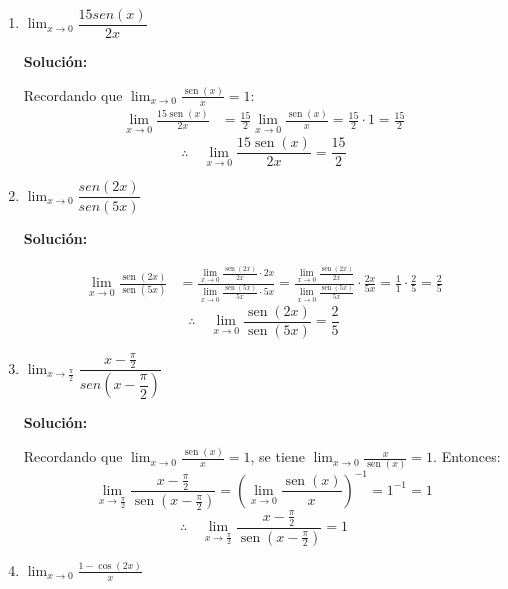\documentclass[12pt]{article}
\newcommand{\solucion}{%
    \vspace{0.8em}%
    \textbf{Solución:}%
}
\begin{document}
\begin{enumerate}[label=\alph*)]
    \item $\lim_{x \to 0} \dfrac{15sen(x)}{2x}$

    \solucion

    Recordando que $\displaystyle\lim_{x\to0}\frac{\operatorname{sen}(x)}{x} = 1$:
    \begin{align*}
        \lim_{x\to0}\frac{15\operatorname{sen}(x)}{2x}
        &= \frac{15}{2}\lim_{x\to0}\frac{\operatorname{sen}(x)}{x}
        = \frac{15}{2} \cdot 1 = \frac{15}{2}
    \end{align*}
    \[
        \therefore\quad \lim_{x\to0}\frac{15\operatorname{sen}(x)}{2x} = \frac{15}{2}
    \]

    \item $\lim_{x \to 0} \dfrac{sen(2x)}{sen(5x)}$

    \solucion
    \begin{align*}
        \lim_{x\to0}\frac{\operatorname{sen}(2x)}{\operatorname{sen}(5x)}
        &= \frac{\displaystyle\lim_{x\to0}\frac{\operatorname{sen}(2x)}{2x}\cdot 2x}{\displaystyle\lim_{x\to0}\frac{\operatorname{sen}(5x)}{5x}\cdot 5x}
        = \frac{\displaystyle\lim_{x\to0}\frac{\operatorname{sen}(2x)}{2x}}{\displaystyle\lim_{x\to0}\frac{\operatorname{sen}(5x)}{5x}} \cdot \frac{2x}{5x}
        = \frac{1}{1} \cdot \frac{2}{5} = \frac{2}{5}
    \end{align*}
    \[
        \therefore\quad \lim_{x\to0}\frac{\operatorname{sen}(2x)}{\operatorname{sen}(5x)} = \frac{2}{5}
    \]

    \item $\lim_{x\to\frac{\pi}{2}} \dfrac{x-\frac{\pi}{2}}{sen\left(x-\dfrac{\pi}{2}\right)}$

    \solucion

    Recordando que $\displaystyle\lim_{x\to0}\frac{\operatorname{sen}(x)}{x} = 1$, se tiene $\displaystyle\lim_{x\to0}\frac{x}{\operatorname{sen}(x)} = 1$. Entonces:
    \[
        \lim_{x\to\frac{\pi}{2}}\frac{x-\frac{\pi}{2}}{\operatorname{sen}\!\left(x-\frac{\pi}{2}\right)}
        = \left(\lim_{x\to0}\frac{\operatorname{sen}(x)}{x}\right)^{-1} = 1^{-1} = 1
    \]
    \[
        \therefore\quad \lim_{x\to\frac{\pi}{2}}\frac{x-\frac{\pi}{2}}{\operatorname{sen}\!\left(x-\frac{\pi}{2}\right)} = 1
    \]

    \newpage
    \item $\displaystyle \lim_{x \to 0} \frac{1-\cos(2x)}{x}$


\end{enumerate}
\end{document}
